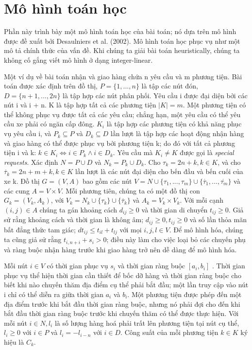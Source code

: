 \chapter{Mô hình toán học}
Phần này trình bày một mô hình toán học của bài toán; nó dựa trên mô hình được đề xuất bởi Desaulniers et al. (2002). Mô hình toán học phục vụ như một mô tả chính thức của vấn đề. Khi chúng ta giải bài toán heuristically, chúng ta không cố gắng viết mô hình ở dạng integer-linear.

Một ví dụ về bài toán nhận và giao hàng chứa n yêu cầu và m phương tiện. Bài toán được xác định trên đồ thị, $P = \{1,...,n\}$ là tập các nút đón, $D=\{n+1,...,2n\}$ là tập hợp các nút phân phối. Yêu cầu i được đại diện bởi các nút i và i + n. K là tập hợp tất cả các phương tiện $|K|=m$. Một phương tiện có thể không phục vụ được tất cả các yêu cầu; chẳng hạn, một yêu cầu có thể yêu cầu xe phải có ngăn cấp đông.
$K_i$ là tập hợp các phương tiện có khả năng phục vụ yêu cầu i, và $P_k \subseteq P$ và $D_k \subseteq D$ lần lượt là tập hợp các hoạt động nhận hàng và giao hàng có thể được phục vụ bởi phương tiện k; do đó với tất cả phương tiện i và k: $k \in K_i \Leftrightarrow i \in P_k \land i \in D_k $. Yêu cầu mà $K_i \ne K$ được gọi là \textit{special requests}. Xác định $N = P \cup D$ và $N_k = P_k \cup D_k$. Cho $\tau_k = 2n +k, k \in K$, và cho $\acute{\tau_k} = 2n + m +k, k \in K$ lần lượt là các nút đại diện cho bến đầu và bến cuối của xe k. 
Đồ thị $G = (V,A)$ bao gồm các nút $V= N \cup \{ \tau_1,...,\tau_m\} \cup \{\acute{\tau_1},...,\acute{\tau_m}\}$ và các cung $A = V \times V$. Mỗi phương tiên, chúng ta có một đồ thị con $G_k = (V_k, A_k)$, với $V_k = N_k \cup \{\tau_k\} \cup \{\acute{\tau_k}\}$ và $A_k =V_k \times V_k$. Với mỗi cạnh $(i, j) \in A$ chúng ta gán khoảng cách $d_{ij} \geq 0$ và thời gian di chuyển $t_{ij} \geq 0$. Giả sử rằng khoảng cách và thời gian là không âm; $d_{ij} \geq 0, t_{ij} \geq 0$ và số lần thỏa mãn bất đẳng thức tam giác; $dt_{ij} \leq t_{il} + t_{lj}$ với mọi $i, j, l \in V$.
Để mô hình hóa, chúng ta cũng giả sử rằng $t_{i,n+i} + s_i > 0$; điều này làm cho việc loại bỏ các chuyến phụ và ràng buộc nhận hàng trước khi giao hàng trở nên dễ dàng để mô hình hóa.

Mỗi nút $i \in V$ có thời gian phục vụ $s_i$ và thời gian ràng buộc $[a_i, b_i]$ . Thời gian phục vụ thể hiện thời gian cần thiết để bốc dỡ hàng và thời gian ràng buộc cho biết khi nào chuyến thăm địa điểm cụ thể phải bắt đầu; một lần truy cập vào nút i chỉ có thể diễn ra giữa thời gian $a_i$ và $b_i$. Một phương tiện được phép đến một địa điểm trước khi bắt đầu thời gian ràng buộc, nhưng nó phải đợi cho đến khi bắt đầu thời gian ràng buộc trước khi chuyến thăm có thể được thực hiện. Với mỗi nút $i \in N, l_i$ là số lượng hàng hoá phải trất lên phương tiện tại nút cụ thể, $l_i \geq 0$ với $i \in P$ và $l_i = -l_{i-n}$ với $i \in D$. Công suất của mỗi phương tiện $k \in K$ ký hiệu là $C_k$.

